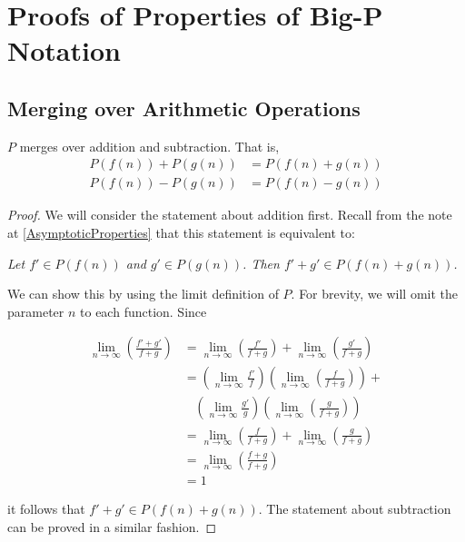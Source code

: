 \appendix
\appendixpage

\section{Proofs of Properties of Big-P Notation}

\subsection{Merging over Arithmetic Operations}
\label{MergingOverArithmetic}

\begin{theorem}
	$P$ merges over addition and subtraction. That is,
	\begin{align*}
	P(f(n)) + P(g(n)) &= P(f(n) + g(n))\\
	P(f(n)) - P(g(n)) &= P(f(n) - g(n))
	\end{align*}
\end{theorem}

\begin{proof}
	We will consider the statement about addition first. Recall from the note at \ref{AsymptoticProperties} that this statement is equivalent to:
	
	\textit{Let $f' \in P(f(n))$ and $g' \in P(g(n))$. Then $f' + g' \in P(f(n) + g(n))$.}
	
	We can show this by using the limit definition of $P$. For brevity, we will omit the parameter $n$ to each function. Since
	
	\begin{align*}
	\lim_{n \to \infty} \left( \frac{f' + g'}{f + g} \right) &= \lim_{n \to \infty} \left( \frac{f'}{f + g} \right) + \lim_{n \to \infty} \left( \frac{g'}{f + g} \right)\\
	&= \left( \lim_{n \to \infty} \frac{f'}{f} \right) \left( \lim_{n \to \infty} \left( \frac{f}{f + g} \right) \right) +\\
	&\ \ \ \ \left( \lim_{n \to \infty} \frac{g'}{g} \right) \left( \lim_{n \to \infty} \left( \frac{g}{f + g} \right) \right)\\
	&= \lim_{n \to \infty} \left( \frac{f}{f + g} \right) + \lim_{n \to \infty} \left( \frac{g}{f + g} \right)\\
	&= \lim_{n \to \infty} \left( \frac{f + g}{f + g} \right)\\
	&= 1
	\end{align*}
	
	it follows that $f' + g' \in P(f(n) + g(n))$. The statement about subtraction can be proved in a similar fashion.
\end{proof}

